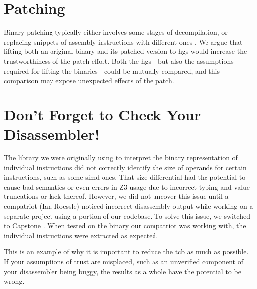 \section{Patching}
Binary patching typically either involves some stages of decompilation, or replacing snippets of assembly instructions with different ones \autocite{duck2020binary}.
We argue that lifting both an original binary and its patched version to \acp{hg} would increase the trustworthiness of the patch effort.
Both the \acp{hg}---but also the assumptions required for lifting the binaries---could be mutually compared, and this comparison may expose unexpected effects of the patch.

\section{Don't Forget to Check Your Disassembler!}
The library we were originally using to interpret the binary representation of individual instructions did not correctly identify the size of operands for certain instructions, such as some \ac{simd} ones.
That size differential had the potential to cause bad semantics or even errors in Z3 usage due to incorrect typing and value truncations or lack thereof.
However, we did not uncover this issue until a compatriot (Ian Roessle) noticed incorrect disassembly output while working on a separate project using a portion of our codebase.
To solve this issue, we switched to Capstone \autocite{capstone}.
When tested on the binary our compatriot was working with, the individual instructions were extracted as expected.

This is an example of why it is important to reduce the \ac{tcb} as much as possible.
If your assumptions of trust are misplaced, such as an unverified component of your disassembler being buggy, the results as a whole have the potential to be wrong.
